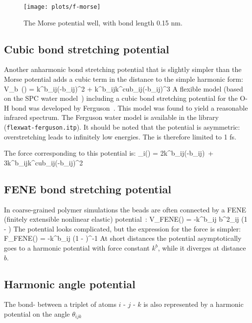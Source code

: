 \begin{figure}
\centerline{\texttt{[image: plots/f-morse]}}
\caption{The Morse potential well, with bond length 0.15 nm.}
\label{fig:morse}
\end{figure}

\subsection{Cubic bond stretching potential}
\label{subsec:cubicbond}
Another anharmonic bond stretching potential that is slightly simpler
than the Morse potential adds a cubic term in the distance to the
simple harmonic form:
\beq
V_b~(\rij) = k^b_{ij}(\rij-b_{ij})^2 + k^b_{ij}k^{cub}_{ij}(\rij-b_{ij})^3
\eeq
A flexible  model (based on
the SPC water model~\cite{Berendsen81}) including 
a cubic bond stretching potential for the O-H bond
was developed by Ferguson~\cite{Ferguson95}. This model was found
to yield a reasonable infrared spectrum. The Ferguson water model is
available in the {\gromacs} library ({\tt flexwat-ferguson.itp}). 
It should be noted that the potential is asymmetric: overstretching leads to
infinitely low energies. The  is therefore
limited to 1 fs.

The force corresponding to this potential is:
\beq
{}_i(\rvij) = 2k^b_{ij}(\rij-b_{ij})~\rnorm + 3k^b_{ij}k^{cub}_{ij}(\rij-b_{ij})^2~\rnorm
\eeq

\subsection{FENE bond stretching potential}
\label{subsec:FENEbond}
In coarse-grained polymer simulations the beads are often connected
by a FENE (finitely extensible nonlinear elastic) potential~\cite{Warner72}:
\beq
V_{\mbox{\small FENE}}(\rij) =
  -\half k^b_{ij} b^2_{ij} \log\left(1 - \right)
\eeq
The potential looks complicated, but the expression for the force is simpler:
\beq
F_{\mbox{\small FENE}}(\rvij) =
  -k^b_{ij} \left(1 - \right)^{-1} \rvij
\eeq
At short distances the potential asymptotically goes to a harmonic
potential with force constant $k^b$, while it diverges at distance $b$.

\subsection{Harmonic angle potential}
\label{subsec:harmonicangle}
\newcommand{\tijk}{\theta_{ijk}}
The bond- between a triplet of atoms $i$ - $j$ - $k$
is also represented by a harmonic potential on the angle $\tijk$

